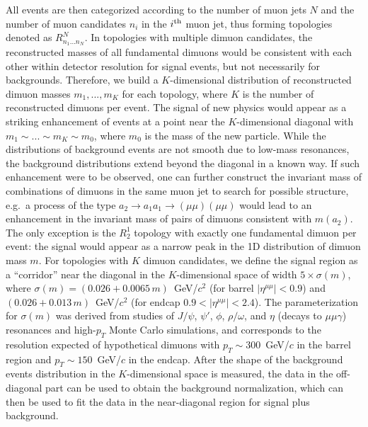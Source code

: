 All events are then categorized according to the number of muon jets $N$ and the number of muon candidates $n_i$ in the $i^{\mbox{\scriptsize th}}$ muon jet, thus forming topologies denoted as $R^{N}_{n_1 ... n_N}$. In topologies with multiple dimuon candidates, the reconstructed masses of all fundamental dimuons would be consistent with each other within detector resolution for signal events, but not necessarily for backgrounds. Therefore, we build a $K$-dimensional distribution of reconstructed dimuon masses $m_1, ..., m_K$ for each topology, where $K$ is the number of reconstructed dimuons per event. The signal of new physics would appear as a striking enhancement of events at a point near the $K$-dimensional diagonal with $m_1 \sim ...\sim m_K \sim m_0$, where $m_0$ is the mass of the new particle. While the distributions of background events are not smooth due to low-mass resonances, the background distributions extend beyond the diagonal in a known way. If such enhancement were to be observed, one can further construct the invariant mass of combinations of dimuons in the same muon jet to search for possible structure, e.g.\ a process of the type $a_2 \to a_1 a_1 \to (\mu\mu) (\mu\mu)$ would lead to an enhancement in the invariant mass of pairs of dimuons consistent with $m(a_2)$. The only exception is the $R^1_2$ topology with exactly one fundamental dimuon per event: the signal would appear as a narrow peak in the 1D distribution of dimuon mass $m$. For topologies with $K$ dimuon candidates, we define the signal region as a ``corridor'' near the diagonal in the $K$-dimensional space of width $5 \times \sigma(m)$, where $\sigma(m) = (0.026 + 0.0065\, m )$~GeV/$c^2$ (for barrel $|\eta^{\mu\mu}| < 0.9$) and $(0.026 + 0.013\, m )$~GeV/$c^2$ (for endcap $0.9 < |\eta^{\mu\mu}| < 2.4$). The parameterization for $\sigma(m)$ was derived from studies of $J/\psi$, $\psi'$, $\phi$, $\rho/\omega$, and $\eta$ (decays to $\mu \mu \gamma$) resonances and high-$p_T$ Monte Carlo simulations, and corresponds to the resolution expected of hypothetical dimuons with $p_T\sim300$~GeV/$c$ in the barrel region and $p_T\sim 150$~GeV/$c$ in the endcap. After the shape of the background events distribution in the $K$-dimensional space is measured, the data in the off-diagonal part can be used to obtain the background normalization, which can then be used to fit the data in the near-diagonal region for signal plus background.

